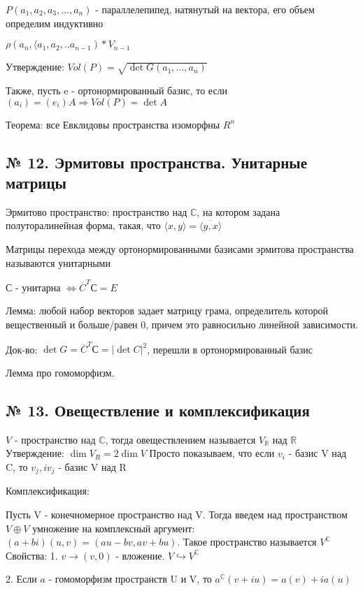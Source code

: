 \documentclass{article}
\begin{document}
$P(a_1, a_2, a_3, ..., a_n)$ - параллелепипед, натянутый на вектора, его объем определим индуктивно

$\rho(a_n, \langle a_1, a_2, .. a_{n - 1}) * V_{n - 1}$

Утверждение: $Vol(P) = \sqrt{\det{G(a_1,..., a_n)}}$

Также, пусть e - ортонормированный базис, то если $(a_i) = (e_i)A \Rightarrow Vol(P) = \det A$

Теорема: все Евклидовы пространства изоморфны $R^n$

\subsection{\tiny № 12. Эрмитовы пространства. Унитарные матрицы}

Эрмитово пространство: пространство над $\mathbb{C}$, на котором задана полуторалинейная форма, такая, что $\langle x, y \rangle = \overline{ \langle y, x \rangle}$

Матрицы перехода между ортонормированными базисами эрмитова пространства называются унитарными

С - унитарна $\Leftrightarrow \overline{C}^TС = E$

Лемма: любой набор векторов задает матрицу грама, определитель которой вещественный и больше/равен 0, причем это равносильно линейной зависимости.

Док-во: $\det{G} = \overline{C}^TС = |\det{C}|^2$, перешли в ортонормированный базис

Лемма про гомоморфизм.

\subsection{\tiny № 13. Овеществление и комплексификация}

$V$ - пространство над $\mathbb{C}$, тогда овеществлением называется $V_{\mathbb{R}}$ над $\mathbb{R}$
Утверждение: $\dim{V_R} = 2 \dim{V}$
Просто показываем, что если $v_i$ - базис V над C, то $v_j, iv_j$ - базис V над R


Комплексификация:

Пусть V - конечномерное пространство над V. Тогда введем над пространством $V \oplus V$ умножение на комплексный аргумент: $(a + bi)(u, v) = (au - bv, av + bu)$. Такое пространство называется $V^{\mathbb{C}}$ 
Свойства: 1. $v \rightarrow (v, 0)$ - вложение. $V \hookrightarrow V^{\mathbb{C}}$

2. Если $a$ - гомоморфизм пространств U и V, то $a^{\mathbb{C}}(v + iu) = a(v) + ia(u)$
\end{document}
